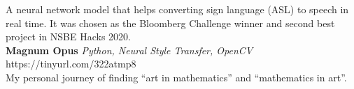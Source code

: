 \documentclass[a4paper]{article}
\begin{document}
A neural network model that helps converting sign language (ASL) to speech in real time. It was chosen as the Bloomberg Challenge winner and second best project in NSBE Hacks 2020.\\
\vspace*{2mm}
{\textbf{Magnum Opus}} {\sl Python, Neural Style Transfer, OpenCV} \hfill https://tinyurl.com/322atmp8\\
My personal journey of finding “art in mathematics” and “mathematics in art”.\\
\vspace*{2mm}
\end{document}
